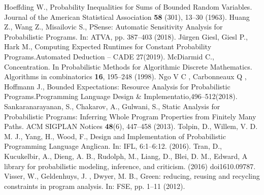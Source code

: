 \documentclass[conference]{IEEEtran}
\begin{document}
\begin{thebibliography}{00}
Hoeffding W., Probability Inequalities for Sums of Bounded Random Variables. Journal of the American Statistical Association \textbf{58} (301), 13--30 (1963).
Huang Z., Wang Z., Misailovic S., PSense: Automatic Sensitivity Analysis for Probabilistic Programs. In: ATVA, pp. 387--403 (2018). 
Jürgen Giesl, Giesl P., Hark M., Computing Expected Runtimes for Constant Probability Programs.Automated Deduction – CADE 27(2019).
McDiarmid C., Concentration. In Probabilistic Methods for Algorithmic Discrete Mathematics. Algorithms in combinatorics \textbf{16}, 195--248 (1998).
Ngo V C , Carbonneaux Q , Hoffmann J., Bounded Expectations: Resource Analysis for Probabilistic Programs.Programming Language Design \& Implementatio,496--512(2018).
Sankaranarayanan, S., Chakarov, A., Gulwani, S., Static Analysis for Probabilistic Programs: Inferring Whole Program Properties from Finitely Many Paths. ACM SIGPLAN Notices \textbf{48}(6), 447--458 (2013).
Tolpin, D., Willem, V. D. M. J., Yang, H., Wood, F., Design and Implementation of Probabilistic Programming Language Anglican. In: IFL, 6:1–6:12. (2016).
Tran, D., Kucukelbir, A., Dieng, A. B., Rudolph, M., Liang, D., Blei, D. M., Edward, A library for probabilistic modeling, inference, and criticism. (2016) doi{1610.09787}.
Visser, W., Geldenhuys, J. , Dwyer, M. B., Green: reducing, reusing and recycling constraints in program analysis. In: FSE, pp. 1--11 (2012).
\end{thebibliography}
\end{document}
